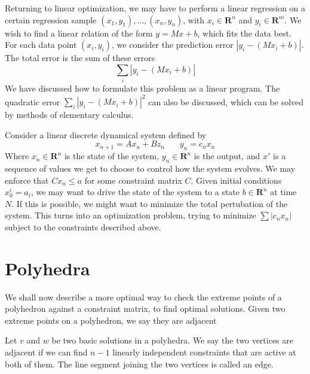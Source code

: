     \begin{example}
        Returning to linear optimization, we may have to perform a linear regression on a certain regression sample $(x_1, y_1), \dots, (x_n, y_n)$, with $x_i \in \mathbf{R}^n$ and $y_i \in \mathbf{R}^m$. We wish to find a linear relation of the form $y = Mx + b$, which fits the data best. For each data point $(x_i, y_i)$, we consider the prediction error $|y_i - (Mx_i + b)|$. The total error is the sum of these errors
        \[ \sum_i |y_i - (Mx_i + b)| \]
        We have discussed how to formulate this problem as a linear program. The quadratic error $\sum_i |y_i - (Mx_i + b)|^2$ can also be discussed, which can be solved by methods of elementary calculus.
    \end{example}

    \begin{example}
        Consider a linear discrete dynamical system defined by
        \[ x_{n+1} = Ax_n + Bz_n\ \ \ \ \ \ \ \ y_n = c_nx_n \]
        Where $x_n \in \mathbf{R}^n$ is the state of the system, $y_n \in \mathbf{R}^n$ is the output, and $x'$ is a sequence of values we get to choose to control how the system evolves. We may enforce that $C x_n \leq a$ for some constraint matrix $C$. Given initial conditions $x_0^i = a_i$, we may want to drive the state of the system to a state $b \in \mathbf{R}^n$ at time $N$. If this is possible, we might want to minimize the total pertubation of the system. This turns into an optimization problem, trying to minimize $\sum |c_nx_n|$ subject to the constraints described above.
    \end{example}






    \chapter{Polyhedra}

    We shall now describe a more optimal way to check the extreme points of a polyhedron against a constraint matrix, to find optimal solutions. Given two extreme points on a polyhedron, we say they are adjacent

    \begin{definition}
        Let $v$ and $w$ be two basic solutions in a polyhedra. We say the two vertices are adjacent if we can find $n-1$ linearly independent constraints that are active at both of them. The line segment joining the two vertices is called an edge.
    \end{definition}

